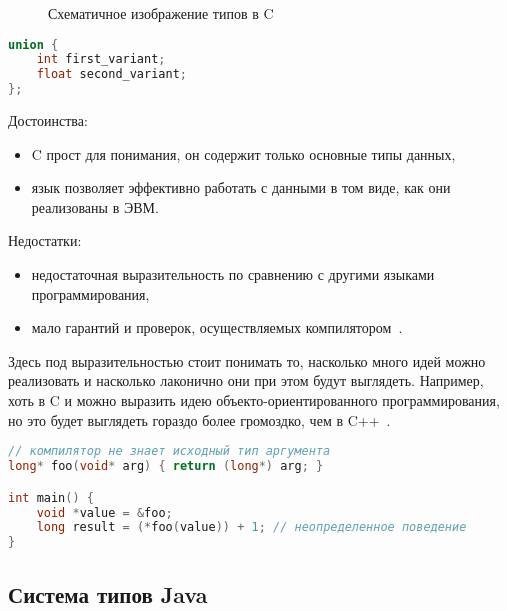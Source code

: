 \begin{figure}[H]
    \centering
    
    \caption{Схематичное изображение типов в C}
    \label{fig:c_types}
\end{figure}

\begin{lstlisting}[label={lst:union},language=C,caption={Объявление безымянного объединения в языке C. В одной переменной твкого типа может содержаться либо целое число, либо вещественное.}]
union {
    int first_variant;
    float second_variant;
};
\end{lstlisting}

Достоинства:
\begin{itemize}
    \item C прост для понимания, он содержит только основные типы данных,
    \item язык позволяет эффективно работать с данными в том виде, как они реализованы в ЭВМ.
\end{itemize}

Недостатки:
\begin{itemize}
    \item недостаточная выразительность по сравнению с другими языками программирования,
    \item мало гарантий и проверок, осуществляемых компилятором~.
\end{itemize}

Здесь под выразительностью стоит понимать то, насколько много идей можно реализовать и насколько лаконично они при этом будут выглядеть.
Например, хоть в C и можно выразить идею объекто-ориентированного программирования, но это будет выглядеть гораздо более громоздко, чем в C++~\cite{OOP_in_C}.

\begin{lstlisting}[label={lst:weak_c},language=C,caption={Неправильное использование \lstinline{void*} не может быть отслежено компилятором}]
// компилятор не знает исходный тип аргумента
long* foo(void* arg) { return (long*) arg; }

int main() {
    void *value = &foo;
    long result = (*foo(value)) + 1; // неопределенное поведениe
}
\end{lstlisting}

\subsection{Система типов Java}
\label{subsec:java_type_system}

